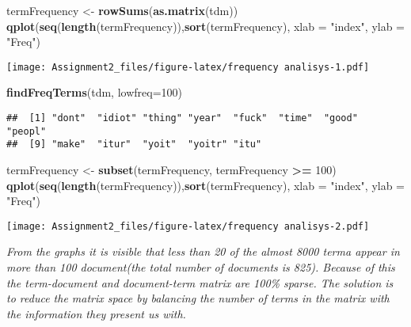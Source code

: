 \documentclass[]{article}
\newenvironment{Shaded}{\begin{snugshade}}{\end{snugshade}}
\newcommand{\DataTypeTok}[1]{\textcolor[rgb]{0.13,0.29,0.53}{#1}}
\newcommand{\DecValTok}[1]{\textcolor[rgb]{0.00,0.00,0.81}{#1}}
\newcommand{\KeywordTok}[1]{\textcolor[rgb]{0.13,0.29,0.53}{\textbf{#1}}}
\newcommand{\NormalTok}[1]{#1}
\newcommand{\OperatorTok}[1]{\textcolor[rgb]{0.81,0.36,0.00}{\textbf{#1}}}
\newcommand{\StringTok}[1]{\textcolor[rgb]{0.31,0.60,0.02}{#1}}
\begin{document}
\begin{Shaded}
\begin{Highlighting}[]
\NormalTok{termFrequency <-}\StringTok{ }\KeywordTok{rowSums}\NormalTok{(}\KeywordTok{as.matrix}\NormalTok{(tdm))}
\KeywordTok{qplot}\NormalTok{(}\KeywordTok{seq}\NormalTok{(}\KeywordTok{length}\NormalTok{(termFrequency)),}\KeywordTok{sort}\NormalTok{(termFrequency), }\DataTypeTok{xlab =} \StringTok{"index"}\NormalTok{, }\DataTypeTok{ylab =} \StringTok{"Freq"}\NormalTok{)}
\end{Highlighting}
\end{Shaded}

\texttt{[image: Assignment2\_files/figure-latex/frequency analisys-1.pdf]}

\begin{Shaded}
\begin{Highlighting}[]
\KeywordTok{findFreqTerms}\NormalTok{(tdm, }\DataTypeTok{lowfreq=}\DecValTok{100}\NormalTok{)}
\end{Highlighting}
\end{Shaded}

\begin{verbatim}
##  [1] "dont"  "idiot" "thing" "year"  "fuck"  "time"  "good"  "peopl"
##  [9] "make"  "itur"  "yoit"  "yoitr" "itu"
\end{verbatim}

\begin{Shaded}
\begin{Highlighting}[]
\NormalTok{termFrequency <-}\StringTok{ }\KeywordTok{subset}\NormalTok{(termFrequency, termFrequency }\OperatorTok{>=}\StringTok{ }\DecValTok{100}\NormalTok{)}
\KeywordTok{qplot}\NormalTok{(}\KeywordTok{seq}\NormalTok{(}\KeywordTok{length}\NormalTok{(termFrequency)),}\KeywordTok{sort}\NormalTok{(termFrequency), }\DataTypeTok{xlab =} \StringTok{"index"}\NormalTok{, }\DataTypeTok{ylab =} \StringTok{"Freq"}\NormalTok{)}
\end{Highlighting}
\end{Shaded}

\texttt{[image: Assignment2\_files/figure-latex/frequency analisys-2.pdf]}

\emph{From the graphs it is visible that less than 20 of the almost 8000
terma appear in more than 100 document(the total number of documents is
825). Because of this the term-document and document-term matrix are
100\% sparse. The solution is to reduce the matrix space by balancing
the number of terms in the matrix with the information they present us
with.}
\end{document}
